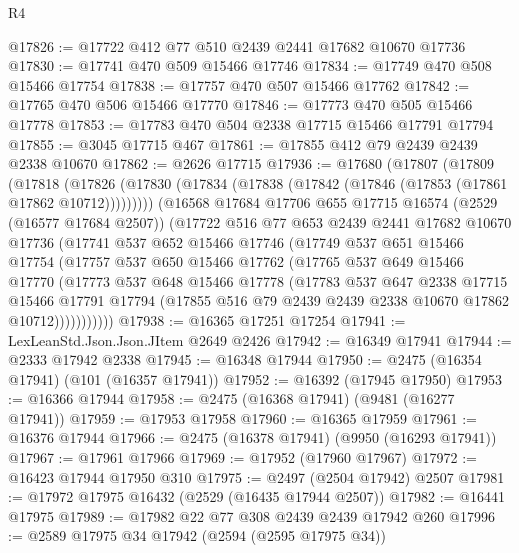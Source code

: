 \begin{lexlean}{R4}
\begin{coremodule}
@17826 := @17722 @412 @77 @510 @2439 @2441 @17682 @10670 @17736
@17830 := @17741 @470 @509 @15466 @17746
@17834 := @17749 @470 @508 @15466 @17754
@17838 := @17757 @470 @507 @15466 @17762
@17842 := @17765 @470 @506 @15466 @17770
@17846 := @17773 @470 @505 @15466 @17778
@17853 := @17783 @470 @504 @2338 @17715 @15466 @17791 @17794
@17855 := @3045 @17715 @467
@17861 := @17855 @412 @79 @2439 @2439 @2338 @10670
@17862 := @2626 @17715
@17936 := @17680
    (@17807
      (@17809
        (@17818
          (@17826 (@17830 (@17834 (@17838 (@17842 (@17846 (@17853 (@17861 @17862 @10712)))))))))
        (@16568
          @17684
          @17706
          @655
          @17715
          @16574
          (@2529 (@16577 @17684 @2507))
          (@17722
            @516
            @77
            @653
            @2439
            @2441
            @17682
            @10670
            @17736
            (@17741
              @537
              @652
              @15466
              @17746
              (@17749
                @537
                @651
                @15466
                @17754
                (@17757
                  @537
                  @650
                  @15466
                  @17762
                  (@17765
                    @537
                    @649
                    @15466
                    @17770
                    (@17773
                      @537
                      @648
                      @15466
                      @17778
                      (@17783
                        @537
                        @647
                        @2338
                        @17715
                        @15466
                        @17791
                        @17794
                        (@17855 @516 @79 @2439 @2439 @2338 @10670 @17862 @10712)))))))))))
@17938 := @16365 @17251 @17254
@17941 := LexLeanStd.Json.Json.JItem @2649 @2426
@17942 := @16349 @17941
@17944 := @2333 @17942 @2338
@17945 := @16348 @17944
@17950 := @2475 (@16354 @17941) (@101 (@16357 @17941))
@17952 := @16392 (@17945 @17950)
@17953 := @16366 @17944
@17958 := @2475 (@16368 @17941) (@9481 (@16277 @17941))
@17959 := @17953 @17958
@17960 := @16365 @17959
@17961 := @16376 @17944
@17966 := @2475 (@16378 @17941) (@9950 (@16293 @17941))
@17967 := @17961 @17966
@17969 := @17952 (@17960 @17967)
@17972 := @16423 @17944 @17950 @310
@17975 := @2497 (@2504 @17942) @2507
@17981 := @17972 @17975 @16432 (@2529 (@16435 @17944 @2507))
@17982 := @16441 @17975
@17989 := @17982 @22 @77 @308 @2439 @2439 @17942 @260
@17996 := @2589 @17975 @34 @17942 (@2594 (@2595 @17975 @34))

\end{coremodule}
\end{lexlean}
